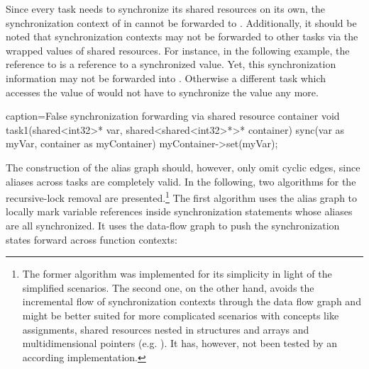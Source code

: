 Since every task needs to synchronize its shared resources on its own, the synchronization context of  in  cannot be forwarded to . Additionally, it should be noted that synchronization contexts may not be forwarded to other tasks via the wrapped values of shared resources. For instance, in the following example, the reference to  is a reference to a synchronized value. Yet, this synchronization information may not be forwarded into . Otherwise a different task which accesses the value of  would not have to synchronize the value any more.

\begin{ccode}{caption=False synchronization forwarding via shared resource container}
void task1(shared<int32>* var, shared<shared<int32>*>* container) {
  sync(var as myVar, container as myContainer) {
    myContainer->set(myVar);
  }
}
\end{ccode}

The construction of the alias graph should, however, only omit cyclic edges, since aliases across tasks are completely valid. In the following, two algorithms for the recursive-lock removal are presented.\footnote{The former algorithm was implemented for its simplicity in light of the simplified scenarios. The second one, on the other hand, avoids the incremental flow of synchronization contexts through the data flow graph and might be better suited for more complicated scenarios with concepts like assignments, shared resources nested in structures and arrays and multidimensional pointers (e.g. ). It has, however, not been tested by an according implementation.} The first algorithm uses the alias graph to locally mark variable references inside synchronization statements whose aliases are all synchronized. It uses the data-flow graph to push the synchronization states forward across function contexts:

